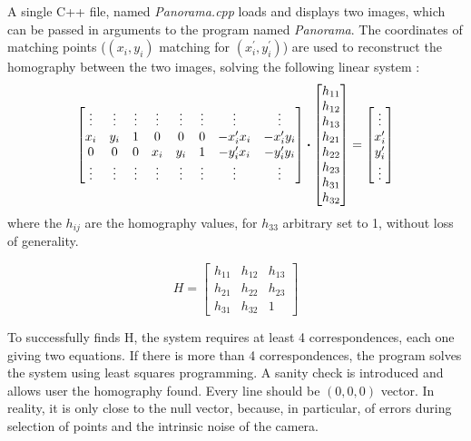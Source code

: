 \documentclass[12pt,a4paper,onecolumn]{article}
\begin{document}
A single C++ file, named \textit{Panorama.cpp} loads and displays two images, which can be passed in arguments to the program named \textit{Panorama}. The coordinates of matching points ($(x_i, y_i)$ matching for $(x_i^{\prime}, y_i^{\prime})$) are used to reconstruct the homography between the two images, solving the following linear system :
$$
	\begin{bmatrix}
		\vdots & \vdots & \vdots & \vdots & \vdots & \vdots & \vdots           & \vdots           \\
		x_i    & y_i    & 1      & 0      & 0      & 0      & -x_i^{\prime}x_i & -x_i^{\prime}y_i \\
		0      & 0      & 0      & x_i    & y_i    & 1      & -y_i^{\prime}x_i & -y_i^{\prime}y_i \\
		\vdots & \vdots & \vdots & \vdots & \vdots & \vdots & \vdots           & \vdots
	\end{bmatrix}
	\dotproduct
	\begin{bmatrix}
		h_{11} \\
		h_{12} \\
		h_{13} \\
		h_{21} \\
		h_{22} \\
		h_{23} \\
		h_{31} \\
		h_{32} \\
	\end{bmatrix}
	=
	\begin{bmatrix}
		\vdots       \\
		x_i^{\prime} \\
		y_i^{\prime} \\
		\vdots
	\end{bmatrix}
$$
where the $h_{ij}$ are the homography values, for $h_{33}$ arbitrary set to 1, without loss of generality.

$$ H =
	\begin{bmatrix}
		h_{11} & h_{12} & h_{13} \\
		h_{21} & h_{22} & h_{23} \\
		h_{31} & h_{32} & 1
	\end{bmatrix}
$$

To successfully finds H, the system requires at least 4 correspondences, each one giving two equations. If there is more than 4 correspondences, the program solves the system using least squares programming.
A sanity check is introduced and allows user the homography found. Every line should be $(0, 0, 0)$ vector. In reality, it is only close to the null vector, because, in particular, of errors during selection of points and the intrinsic noise of the camera.
\end{document}
